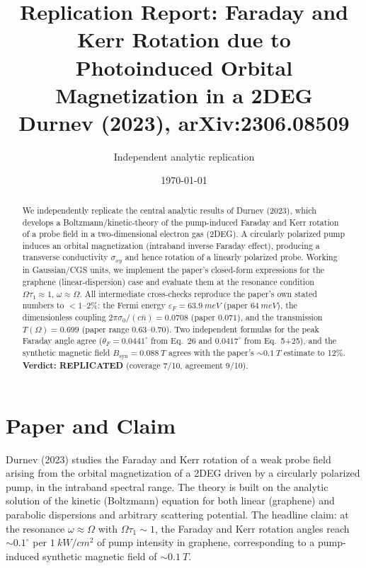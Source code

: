 \documentclass[11pt]{article}
\title{Replication Report: Faraday and Kerr Rotation due to Photoinduced
Orbital Magnetization in a 2DEG\\
\large Durnev (2023), arXiv:2306.08509}
\author{Independent analytic replication}
\date{\today}
\begin{document}
\maketitle

\begin{abstract}
We independently replicate the central analytic results of Durnev (2023),
which develops a Boltzmann/kinetic-theory of the pump-induced Faraday and
Kerr rotation of a probe field in a two-dimensional electron gas (2DEG).
A circularly polarized pump induces an orbital magnetization (intraband
inverse Faraday effect), producing a transverse conductivity
$\sigma_{xy}$ and hence rotation of a linearly polarized probe. Working in
Gaussian/CGS units, we implement the paper's closed-form expressions for the
graphene (linear-dispersion) case and evaluate them at the resonance condition
$\Omega\tau_1\approx1$, $\omega\approx\Omega$. All intermediate cross-checks
reproduce the paper's own stated numbers to $<1$--2\%: the Fermi energy
$\varepsilon_F=\SI{63.9}{meV}$ (paper $\SI{64}{meV}$), the dimensionless
coupling $2\pi\sigma_0/(c\bar n)=0.0708$ (paper $0.071$), and the transmission
$T(\Omega)=0.699$ (paper range $0.63$--$0.70$). Two independent formulas for the
peak Faraday angle agree ($\theta_F=0.0441^\circ$ from Eq.~26 and
$0.0417^\circ$ from Eq.~5+25), and the synthetic magnetic field
$B_{\mathrm{syn}}=\SI{0.088}{T}$ agrees with the paper's $\sim\SI{0.1}{T}$
estimate to 12\%. \textbf{Verdict: REPLICATED} (coverage 7/10,
agreement 9/10).
\end{abstract}

\section{Paper and Claim}
Durnev (2023) studies the Faraday and Kerr rotation of a weak probe field
arising from the orbital magnetization of a 2DEG driven by a circularly
polarized pump, in the intraband spectral range. The theory is built on the
analytic solution of the kinetic (Boltzmann) equation for both linear
(graphene) and parabolic dispersions and arbitrary scattering potential. The
headline claim: at the resonance $\omega\approx\Omega$ with $\Omega\tau_1\sim1$,
the Faraday and Kerr rotation angles reach $\sim0.1^\circ$ per
$\SI{1}{kW/cm^2}$ of pump intensity in graphene, corresponding to a
pump-induced synthetic magnetic field of $\sim\SI{0.1}{T}$.
\end{document}
